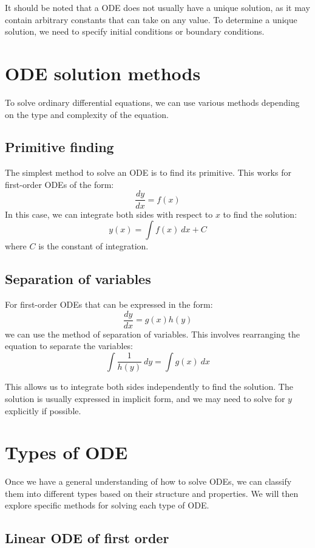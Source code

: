 It should be noted that a ODE does not usually have a unique solution, as it may contain arbitrary constants that can take on any value. To determine a unique solution, we need to specify initial conditions or boundary conditions.

\section{ODE solution methods}

To solve ordinary differential equations, we can use various methods depending on the type and complexity of the equation.

\subsection{Primitive finding}

The simplest method to solve an ODE is to find its primitive. This works for first-order ODEs of the form:
\[
    \frac{dy}{dx} = f(x)
\]
In this case, we can integrate both sides with respect to $x$ to find the solution:
\[
    y(x) = \int f(x) \ dx + C
\]
where $C$ is the constant of integration.

\subsection{Separation of variables}

For first-order ODEs that can be expressed in the form:
\[
    \frac{dy}{dx} = g(x)h(y)
\]
we can use the method of separation of variables. This involves rearranging the equation to separate the variables:
\[
    \int \frac{1}{h(y)} \ dy = \int g(x) \ dx
\]

This allows us to integrate both sides independently to find the solution. The solution is usually expressed in implicit form, and we may need to solve for $y$ explicitly if possible.

\section{Types of ODE}

Once we have a general understanding of how to solve ODEs, we can classify them into different types based on their structure and properties. We will then explore specific methods for solving each type of ODE.

\subsection{Linear ODE of first order}

